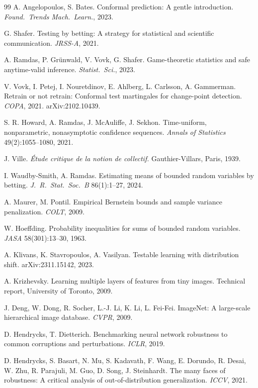 \begin{thebibliography}{99}
 A. Angelopoulos, S. Bates. Conformal prediction: A gentle
introduction. \emph{Found.\ Trends Mach.\ Learn.}, 2023.

 G. Shafer. Testing by betting: A strategy for statistical and
scientific communication. \emph{JRSS-A}, 2021.

 A. Ramdas, P. Gr\"unwald, V. Vovk, G. Shafer. Game-theoretic
statistics and safe anytime-valid inference. \emph{Statist.\ Sci.}, 2023.

 V. Vovk, I. Petej, I. Nouretdinov, E. Ahlberg,
L. Carlsson, A. Gammerman. Retrain or not retrain: Conformal test martingales for
change-point detection. \emph{COPA}, 2021. arXiv:2102.10439.

 S. R. Howard, A. Ramdas, J. McAuliffe, J. Sekhon.
Time-uniform, nonparametric, nonasymptotic confidence sequences.
\emph{Annals of Statistics} 49(2):1055--1080, 2021.

 J. Ville. \emph{\'Etude critique de la notion de collectif.}
Gauthier-Villars, Paris, 1939.

 I. Waudby-Smith, A. Ramdas. Estimating means of bounded
random variables by betting. \emph{J.\ R.\ Stat.\ Soc.\ B} 86(1):1--27, 2024.

 A. Maurer, M. Pontil. Empirical Bernstein bounds and
sample variance penalization. \emph{COLT}, 2009.

 W. Hoeffding. Probability inequalities for sums of
bounded random variables. \emph{JASA} 58(301):13--30, 1963.

 A. Klivans, K. Stavropoulos, A. Vasilyan. Testable
learning with distribution shift. arXiv:2311.15142, 2023.

 A. Krizhevsky. Learning multiple layers of
features from tiny images. Technical report, University of Toronto, 2009.

 J. Deng, W. Dong, R. Socher, L.-J. Li, K. Li, L. Fei-Fei.
ImageNet: A large-scale hierarchical image database. \emph{CVPR}, 2009.

 D. Hendrycks, T. Dietterich. Benchmarking neural
network robustness to common corruptions and perturbations. \emph{ICLR}, 2019.

 D. Hendrycks, S. Basart, N. Mu, S. Kadavath,
F. Wang, E. Dorundo, R. Desai, W. Zhu, R. Parajuli, M. Guo, D. Song, J. Steinhardt.
The many faces of robustness: A critical analysis of out-of-distribution
generalization. \emph{ICCV}, 2021.


\end{thebibliography}
